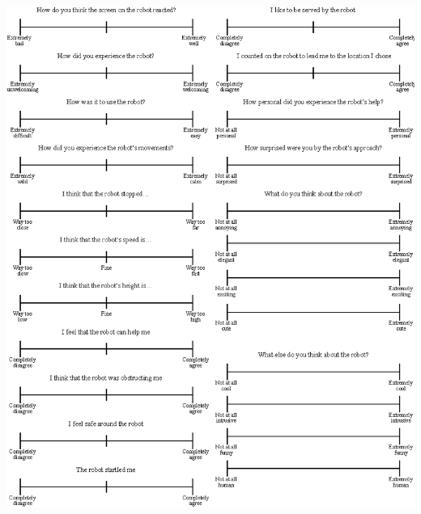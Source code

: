 \documentclass[paperwidth=160cm,paperheight=100cm,landscape,fontscale=0.3010]{baposter}
\begin{document}
\begin{poster}
{\begin{center}
	\includegraphics[width=1.0\linewidth]{AllScalesSpace.eps}

\end{center}

}
\end{poster}
\end{document}
